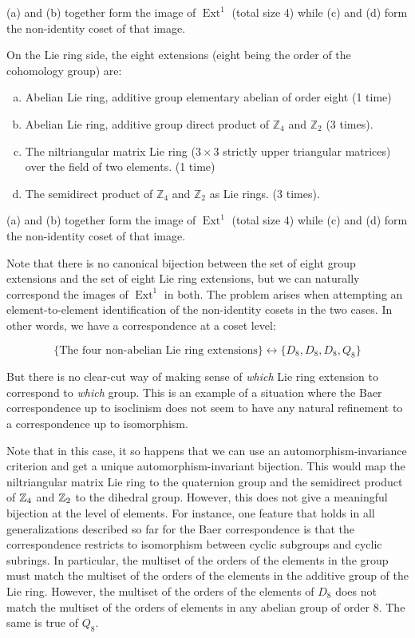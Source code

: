 \documentclass[10pt]{amsart}
\begin{document}
(a) and (b) together form the image of $\operatorname{Ext}^1$ (total
size 4) while (c) and (d) form the non-identity coset of that
image.

On the Lie ring side, the eight extensions (eight being the order of the cohomology group) are:

\begin{enumerate}[(a)]
\item Abelian Lie ring, additive group elementary abelian of order eight (1 time)
\item Abelian Lie ring, additive group direct product of
  $\mathbb{Z}_4$ and $\mathbb{Z}_2$ (3 times).
\item The niltriangular matrix Lie ring ($3 \times 3$ strictly upper
  triangular matrices) over the field of two elements. (1 time)
\item The semidirect product of $\mathbb{Z}_4$ and $\mathbb{Z}_2$ as
  Lie rings. (3 times).
\end{enumerate}

(a) and (b) together form the image of $\operatorname{Ext}^1$ (total
size 4) while (c) and (d) form the non-identity coset of that
image.

Note that there is no canonical bijection between the set of eight
group extensions and the set of eight Lie ring extensions, but we can
naturally correspond the images of $\operatorname{Ext}^1$ in both. The
problem arises when attempting an element-to-element identification of the
non-identity cosets in the two cases. In other words, we have a
correspondence at a coset level:

$$\{ \text{The four non-abelian Lie ring extensions} \} \leftrightarrow \{ D_8, D_8, D_8, Q_8 \}$$

But there is no clear-cut way of making sense of {\em which} Lie ring
extension to correspond to {\em which} group. This is an example of a
situation where the Baer correspondence up to isoclinism does not seem
to have any natural refinement to a correspondence up to isomorphism.

Note that in this case, it so happens that we can use an
automorphism-invariance criterion and get a unique
automorphism-invariant bijection. This would map the niltriangular
matrix Lie ring to the quaternion group and the semidirect product of
$\mathbb{Z}_4$ and $\mathbb{Z}_2$ to the dihedral group. However, this does not give a
meaningful bijection at the level of elements. For instance, one
feature that holds in all generalizations described so far for the
Baer correspondence is that the correspondence restricts to
isomorphism between cyclic subgroups and cyclic subrings. In
particular, the multiset of the orders of the elements in the group
must match the multiset of the orders of the elements in the additive
group of the Lie ring. However, the multiset of the orders of the
elements of $D_8$ does not match the multiset of the orders of
elements in any abelian group of order $8$. The same is true of $Q_8$.
\end{document}
